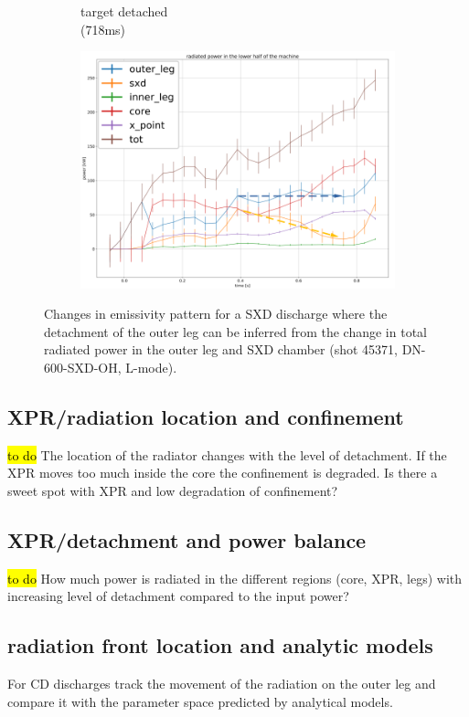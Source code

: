 \begin{figure}
\begin{subfigure}{0.21\textwidth}
         \caption{target detached\\(718ms)}
         \label{fig:45371_2}
     \end{subfigure}
     \hfill
     \begin{subfigure}{0.5\textwidth}
         \centering
         \includegraphics[trim={0 0 0 0},clip,width=\textwidth]{Chapters/chapter2/figs/45371_3.png}
         \label{fig:45371_3}
     \end{subfigure}
    \caption{Changes in emissivity pattern for a SXD discharge where the detachment of the outer leg can be inferred from the change in total radiated power in the outer leg and SXD chamber (shot 45371, DN-600-SXD-OH, L-mode).}
    \label{fig:45371}
\end{figure}

\subsection{XPR/radiation location and confinement}
\hl{to do}
The location of the radiator changes with the level of detachment. If the XPR moves too much inside the core the confinement is degraded. Is there a sweet spot with XPR and low degradation of confinement?
\subsection{XPR/detachment and power balance}
\hl{to do}
How much power is radiated in the different regions (core, XPR, legs) with increasing level of detachment compared to the input power?
\subsection{radiation front location and analytic models}
For CD discharges track the movement of the radiation on the outer leg and compare it with the parameter space predicted by analytical models.
